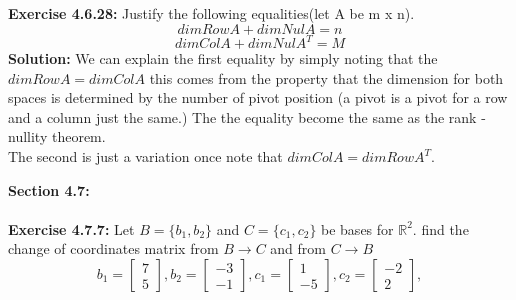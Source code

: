 \documentclass{amsart}
\def\RR{{\mathbb R}}
\begin{document}
\noindent\textbf{Exercise 4.6.28: } Justify the following equalities(let A be m x n).
\begin{equation}
dim Row A + dim Nul A  = n
\end{equation}
\begin{equation}
dim Col A + dim Nul A^T  = M
\end{equation}
\noindent \textbf{Solution: } We can explain the first equality by simply noting that the $dim Row A = dim Col A$ this comes from the property that the dimension for both spaces is determined by the number of pivot position (a pivot is a pivot for a row and a column just the same.) The the equality become the same as the rank - nullity theorem.\\

The second is just a variation once note that $dim Col A = dim Row A^T$.
\vspace{1in}





{\huge\textbf{Section 4.7:}}\\\\

\noindent\textbf{Exercise 4.7.7: } Let $B = \{b_1,b_2\}$ and $C = \{c_1,c_2\}$ be bases for $\RR^2$. find the change of coordinates matrix from $B \to C$ and from $C \to B$
\begin{equation*}
b_1 =
\begin{bmatrix}
7\\
5
\end{bmatrix},
b_2 =
\begin{bmatrix}
-3\\
-1
\end{bmatrix},
c_1 =
\begin{bmatrix}
1\\
-5
\end{bmatrix},
c_2 =
\begin{bmatrix}
-2\\
2
\end{bmatrix},
\end{equation*}
\end{document}

